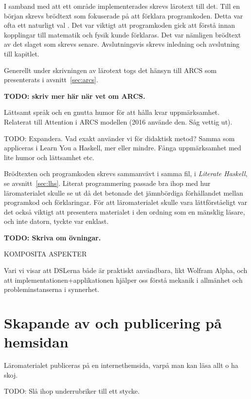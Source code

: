 \begin{binge}
I samband med att ett område implementerades skrevs lärotext till det. Till en
början skrevs brödtext som fokuserade på att förklara programkoden. Detta var
ofta ett naturligt val . Det var viktigt att
programkoden gick att förstå innan kopplingar till matematik och fysik kunde
förklaras. Det var nämligen brödtext av det slaget som skrevs senare.
Avslutningsvis skrevs inledning och avslutning till kapitlet.

Generellt under skrivningen av lärotext togs det hänsyn till ARCS som
presenterats i avsnitt~\ref{sec:arcs}. 

\textbf{TODO: skriv mer här när vet om ARCS.}

Lättsamt språk och en gnutta humor för att hålla kvar
uppmärksamhet. Relaterat till Attention i ARCS modellen (2016
använde den. Såg vettig ut).

TODO: Expandera. Vad exakt använder vi för didaktisk metod? Samma
som appliceras i Learn You a Haskell, mer eller mindre. Fånga
uppmärksamhet med lite humor och lättsamhet etc.

Brödtexten och programkoden skrevs sammanvävt i samma fil, i \textit{Literate
Haskell}, se avsnitt~\ref{sec:lhs}. Literat programmering passade bra ihop med
hur läromaterialet skulle se ut då det betonade det jämnbördiga förhållandet
mellan programkod och förklaringar. För att läromaterialet skulle vara
lättförståeligt var det också viktigt att presentera materialet i den ordning
som en mänsklig läsare, och inte datorn, tyckte var enklast.

\textbf{TODO: Skriva om övningar.}

KOMPOSITA ASPEKTER

Vari vi visar att DSLerna både är praktiskt användbara, likt Wolfram
Alpha, och att implementationen+applikationen hjälper oss förstå
mekanik i allmänhet och probleminstanserna i synnerhet.

\section{Skapande av och publicering på hemsidan}

  Läromaterialet publiceras på en internethemsida, varpå man kan läsa
  allt o ha skoj.

  TODO: Slå ihop underrubriker till ett stycke.


\end{binge}
